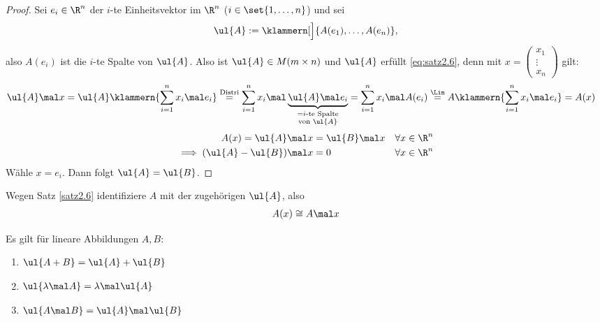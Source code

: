 \begin{proof}
	Sei $e_i\in\R^n$ der $i$-te Einheitsvektor im $\R^n$ ($i\in\set{1,\ldots,n}$)
	und sei
	\begin{align*}
		\ul{A}:=\klammern[\Big]{A(e_1),\ldots,A(e_n)},
	\end{align*}
	also $A(e_i)$ ist die $i$-te Spalte von $\ul{A}$.
	Also ist $\ul{A}\in M(m\times n)$ und $\ul{A}$ erfüllt \eqref{eq:satz2.6}, denn mit $x=\begin{pmatrix}
		x_1\\
		\vdots\\
		x_n
	\end{pmatrix}$ gilt:
	\begin{align*}
		\ul{A}\mal x
		&=\ul{A}\klammern{\sum\limits_{i=1}^n x_i\mal e_i}
		\overset{\text{Distri}}{=}
		\sum\limits_{i=1}^n x_i\mal\underbrace{\ul{A}\mal e_i}_{
			\begin{subarray}{c}
				=i\text{-te Spalte}\\
				\text{von }\ul{A}
			\end{subarray}
		}
		=\sum\limits_{i=1}^n x_i\mal A(e_i)
		\overset{\Lin}{=}
		A\klammern{\sum\limits_{i=1}^n x_i\mal e_i}
		=A(x)
	\end{align*}
	\begin{align*}
		A(x)=\ul{A}\mal x&=\ul{B}\mal x &\forall& x\in\R^n\\
		\implies (\ul{A}-\ul{B})\mal x&=0 &\forall& x\in\R^n
	\end{align*}
	Wähle $x=e_i$. Dann folgt $\ul{A}=\ul{B}$.
\end{proof}

Wegen Satz \ref{satz2.6} identifiziere $A$ mit der zugehörigen 
$\ul{A}$, also
\begin{align*}
	A(x)\cong A\mal x
\end{align*}

Es gilt für lineare Abbildungen $A,B$: 
\begin{enumerate}[label=(\roman*)]
	\item $\begin{aligned}
		\ul{A+B}=\ul{A}+\ul{B} \label{item:nachSatz2.6(i)}
	\end{aligned}$
	\item $\begin{aligned}
		\ul{\lambda\mal A}=\lambda\mal\ul{A} \label{item:nachSatz2.6(ii)}
	\end{aligned}$
	\item $\begin{aligned}
		\ul{A\mal B}=\ul{A}\mal\ul{B} \label{item:nachSatz2.6(iii)}
	\end{aligned}$
\end{enumerate}

